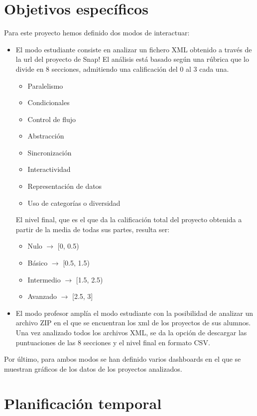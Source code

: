 \documentclass[a4paper, 12pt]{book}
\begin{document}
\section{Objetivos específicos}
\label{sec:objetivos-especificos}

Para este proyecto hemos definido dos modos de interactuar:
\begin{itemize}
\item 
El modo estudiante  consiste en  analizar un fichero XML obtenido a través de la url del proyecto de Snap! El análisis está basado según una rúbrica  que lo divide en 8 secciones, admitiendo una calificación del 0 al 3 cada una.
\begin{itemize}
      \item
     Paralelismo
      \item
     Condicionales
      \item
      Control de flujo
      \item
      Abstracción
      \item
      Sincronización
      \item
      Interactividad
      \item
      Representación de datos
      \item
      Uso de categorías o diversidad
    \end{itemize}
El nivel final, que es el que da la calificación total del proyecto obtenida a partir de la media de todas sus partes, resulta ser:
    \begin{itemize}
          \item
          Nulo $\rightarrow $ [0, 0.5)
          \item
          Básico $\rightarrow $ [0.5, 1.5)
          \item
          Intermedio $\rightarrow $ [1.5, 2.5)
          \item
          Avanzado $\rightarrow $ [2.5, 3]
     \end{itemize}
\item
El modo profesor amplía el modo estudiante con la posibilidad de analizar un archivo ZIP en el que se encuentran los xml de los proyectos de sus alumnos. Una vez analizado todos los archivos XML, se da la opción de descargar las puntuaciones  de las 8 secciones y el nivel final en formato CSV.

\end{itemize}
Por último, para ambos modos se han definido varios dashboards en el que se muestran gráficos de los datos de los proyectos analizados.
\section{Planificación temporal}
\label{sec:planificacion-temporal}
\end{document}
